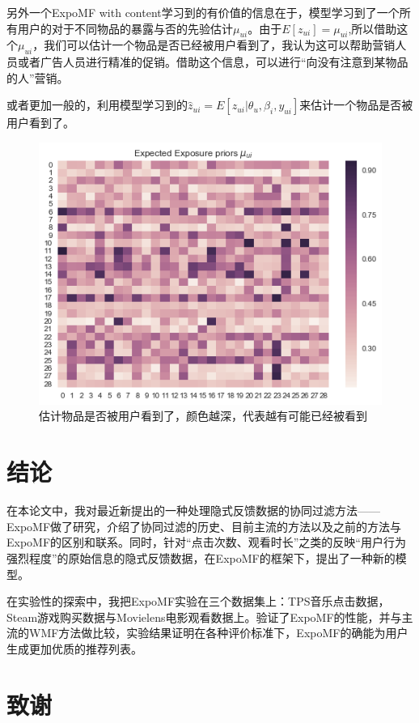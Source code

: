 \documentclass[notitlepage,cs4size,punct,oneside]{ctexrep}
\numberwithin{equation}{chapter}
\theoremstyle{mystyle}
\begin{document}
\par
另外一个ExpoMF with content学习到的有价值的信息在于，模型学习到了一个所有用户的对于不同物品的暴露与否的先验估计$\mu_{ui}$。由于$E[z_{ui}]=\mu_{ui}$,所以借助这个$\mu_{ui}$，我们可以估计一个物品是否已经被用户看到了，我认为这可以帮助营销人员或者广告人员进行精准的促销。借助这个信息，可以进行“向没有注意到某物品的人”营销。
\par
或者更加一般的，利用模型学习到的$\hat{z}_{ui}=E[z_{ui}|\theta_u,\beta_i,y_{ui}]$来估计一个物品是否被用户看到了。
\begin{figure}[h]
 \includegraphics[width=\textwidth]{./results/heatmap.png}
 \caption{估计物品是否被用户看到了，颜色越深，代表越有可能已经被看到}
 \label{figure:heatmap}
\end{figure}

\chapter{结论}
在本论文中，我对最近新提出的一种处理隐式反馈数据的协同过滤方法\cite{EXPOMF}——ExpoMF做了研究，介绍了协同过滤的历史、目前主流的方法以及之前的方法与ExpoMF的区别和联系。同时，针对“点击次数、观看时长”之类的反映“用户行为强烈程度”的原始信息的隐式反馈数据，在ExpoMF的框架下，提出了一种新的模型。
\par
在实验性的探索中，我把ExpoMF实验在三个数据集上：TPS音乐点击数据，Steam游戏购买数据与Movielens电影观看数据上。验证了ExpoMF的性能，并与主流的WMF方法做比较，实验结果证明在各种评价标准下，ExpoMF的确能为用户生成更加优质的推荐列表。



\chapter*{\heiti 致谢}
\end{document}
